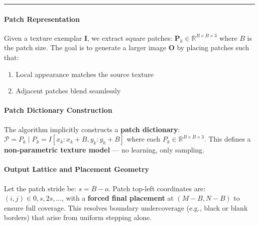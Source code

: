 \documentclass[11pt]{article}
\providecommand{\tightlist}{%
      \setlength{\itemsep}{0pt}\setlength{\parskip}{0pt}}
\begin{document}
\begin{center}\rule{0.5\linewidth}{0.5pt}\end{center}

\hypertarget{patch-representation}{%
\paragraph{\texorpdfstring{\textbf{Patch
Representation}}{Patch Representation}}\label{patch-representation}}

Given a texture exemplar \(\mathbf{I}\), we extract square patches:
\(\mathbf{P}_k \in \mathbb{R}^{B \times B \times 3}\) where \(B\) is the
patch size. The goal is to generate a larger image \(\mathbf{O}\) by
placing patches such that:

\begin{enumerate}
\def\labelenumi{\arabic{enumi}.}
\tightlist
\item
  Local appearance matches the source texture
\item
  Adjacent patches blend seamlessly
\end{enumerate}

\hypertarget{patch-dictionary-construction}{%
\paragraph{\texorpdfstring{\textbf{Patch Dictionary
Construction}}{Patch Dictionary Construction}}\label{patch-dictionary-construction}}

The algorithm implicitly constructs a \textbf{patch dictionary}:
\(\mathcal{P} = { P_k \mid P_k = I[x_k : x_k + B, y_k : y_k + B] }\)
where each \(P_k \in \mathbb{R}^{B \times B \times 3}\). This defines a
\textbf{non-parametric texture model} --- no learning, only sampling.

\hypertarget{output-lattice-and-placement-geometry}{%
\paragraph{\texorpdfstring{\textbf{Output Lattice and Placement
Geometry}}{Output Lattice and Placement Geometry}}\label{output-lattice-and-placement-geometry}}

Let the patch stride be: \(s = B - o\). Patch top-left coordinates are:
\((i,j) \in {0, s, 2s, \dots}\), with a \textbf{forced final placement}
at \((M-B, N-B)\) to ensure full coverage. This resolves boundary
undercoverage (e.g., black or blank borders) that arise from uniform
stepping alone.
\end{document}
